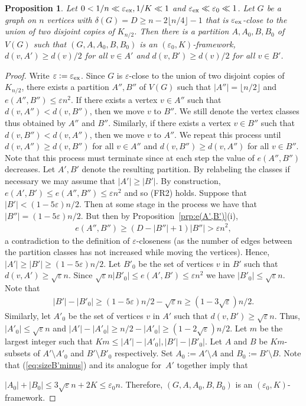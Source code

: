 \documentclass{memo-l}
\newtheorem{prop}[firstthm]{Proposition}
\def\COMMENT#1{}
\def\eps{\varepsilon}
\def\epszero{\eps_0}
\numberwithin{section}{chapter}
\numberwithin{equation}{section}
\numberwithin{firstthm}{section}
\numberwithin{figure}{section}
\begin{document}
\begin{prop} \label{prop:framework}
Let $0 < 1/n \ll \eps_{\rm ex} ,1/K \ll 1$ and $\eps_{\rm ex} \ll \epszero \ll 1$.
Let $G$ be a graph on $n$ vertices with $\delta(G) = D \ge n - 2\lfloor n/4 \rfloor -1$ that is $\eps_{\rm ex} $-close to the union of two disjoint copies of $K_{n/2}$.
Then there is a partition $A,A_0,B,B_0$ of $V(G)$ such that $(G,A,A_0,B,B_0)$ is an $(\epszero, K)$-framework, $d(v, A') \ge d(v)/2$ for all $v\in A'$ and
$d(v, B') \ge d(v)/2$ for all $v\in B'$.
\end{prop}
\begin{proof}
Write $\eps: = \eps_{\rm ex}$.
Since $G$ is $\eps $-close to the union of two disjoint copies of $K_{n/2}$, there exists a partition $A'', B''$ of $V(G)$ such that
$|A''|=\lfloor n/2\rfloor$ and $e(A'',B'') \le \eps n^2$.
If there exists a vertex $v \in A''$ such that $d(v,A'') < d(v,B'')$, then we move $v$ to $B''$. We still denote the
vertex classes thus obtained by $A''$ and $B''$.
Similarly, if there exists a vertex $v \in B''$ such that $d(v,B'') < d(v,A'')$, then we move $v$ to $A''$.
We repeat this process until $d(v,A'') \ge d(v,B'')$ for all $v \in A''$ and $d(v,B'') \ge d(v,A'')$ for all $v \in B''$.
Note that this process must terminate since at each step the value of $e(A'',B'')$ decreases.
Let $A',B'$ denote the resulting partition. By relabeling the classes if necessary we may assume that $|A'| \ge |B'|$.
By construction, $e(A',B') \le e(A'',B'') \le \eps n^2$ and so (FR2) holds. 
Suppose that $|B'| < (1- 5\eps)n/2$. Then at some stage in the process we have that $|B''|=(1- 5 \eps)n/2$.
But then by Proposition~\ref{prp:e(A',B')}(i), 
\begin{align*}
	 e(A'',B'') \ge (D - |B''|+1 ) |B''| > \eps n^2,
\end{align*}
a contradiction to the definition of $\eps$-closeness (as the number of edges between the partition classes has 
not increased while moving the vertices). Hence, $|A'|\ge |B'| \ge (1- 5\eps)n/2$. Let $B'_0$ be the set of vertices $v$ in $B'$ such that
$d(v,A') \ge \sqrt{\eps} n$. Since $\sqrt{\eps} n |B'_0|  \le e(A',B') \le \eps n^2$ we have $|B'_0| \le \sqrt{\eps}n$.
Note that\COMMENT{Deryk} 
\begin{align}\label{eq:sizeB'minus}
|B'| - |B'_0| \ge ( 1- 5 \eps ) n /2 - \sqrt{\eps } n \ge (1- 3\sqrt{ \eps} )n/2.
\end{align}
Similarly, let $A'_0$ be the set of vertices $v$ in $A'$ such that $d(v,B') \ge \sqrt{\eps} n $.
Thus, $|A'_0|  \le \sqrt{\eps }n$ and $|A'| - |A'_0| \ge n/2-|A'_0| \ge (1-2\sqrt{ \eps} )n/2$.
Let $m$ be the largest integer such that $Km \le |A'| - |A'_0|, |B'| - |B'_0|$.
Let $A$ and $B$ be $Km$-subsets of $A' \setminus A'_0$ and $B' \setminus B'_0$ respectively.
Set $A_0 := A' \setminus A$ and $B_0 := B' \setminus B$.
Note that (\ref{eq:sizeB'minus}) and its analogue for~$A'$ together imply that%
   \COMMENT{Daniela: changed the explanation here}
$|A_0| + |B_0| \le 3 \sqrt{\eps}n +2K\le \eps_0 n$.
Therefore, $(G, A,A_0,B,B_0)$ is an $(\epszero,K)$-framework.
\end{proof}
\end{document}
